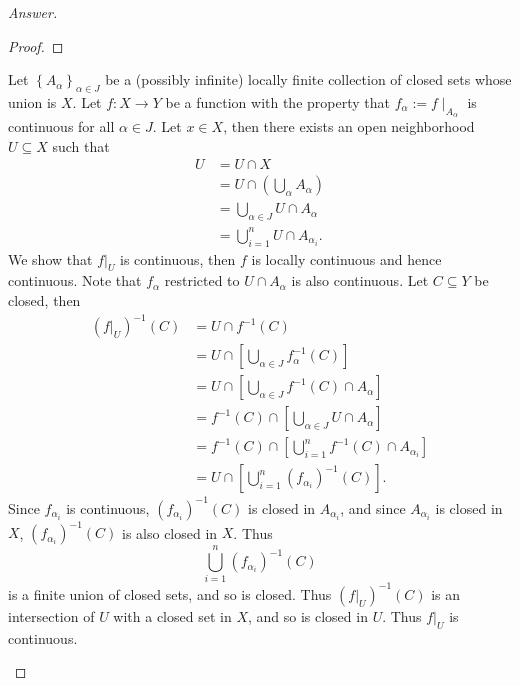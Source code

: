 \documentclass[12pt]{article}
\newcommand\inv[1]{#1^{-1}}
\newcommand\paren[1]{\left( #1 \right)}
\newcommand\setb[1]{\left \{ #1 \right \}}
\newcommand{\sqbrack}[1]{\left [ #1 \right ]}
\theoremstyle{definition}
\begin{document}
\begin{proof}[Answer]
\begin{enumerate}[(i)]
\begin{proof}
        \end{proof}
        Let $\setb{ A_{\alpha} }_{\alpha \in J}$ be a (possibly infinite) locally finite collection of closed sets whose union is $X$. Let $f : X \to Y$ be a function with the property that $f_{\alpha} := f \mid_{A_{\alpha}}$ is continuous for all $\alpha \in J$. Let $x \in X$, then there exists an open neighborhood $U \subseteq X$ such that 
        \begin{align*}
            U & = U \cap X \\
            & = U \cap \paren{ \bigcup\limits_{\alpha} A_{\alpha} } \\
            & = \bigcup\limits_{\alpha \in J} U \cap A_{\alpha} \\
            & = \bigcup\limits_{i = 1}^n U \cap A_{\alpha_i}.
        \end{align*}
        We show that $\left. f \right|_U$ is continuous, then $f$ is locally continuous and hence continuous. Note that $f_{\alpha}$ restricted to $U \cap A_{\alpha}$ is also continuous. Let $C \subseteq Y$ be closed, then 
        \begin{align*}
            \inv{ \paren{ \left. f \right|_U } }(C) & = U \cap \inv{f}(C) \\
            & = U \cap \sqbrack{ \bigcup\limits_{\alpha \in J} \inv{f_{\alpha}}(C) } \\
            & = U \cap \sqbrack{ \bigcup\limits_{\alpha \in J} \inv{f}(C) \cap A_{\alpha} } \\
            & = \inv{f}(C) \cap \sqbrack{ \bigcup\limits_{\alpha \in J} U \cap A_{\alpha} } \\
            & = \inv{f}(C) \cap \sqbrack{ \bigcup\limits_{i = 1}^n \inv{f}(C) \cap A_{\alpha_i} } \\
            & = U \cap \sqbrack{ \bigcup\limits_{i = 1}^n \inv{ \paren{ f_{\alpha_i} } } (C) }.
        \end{align*}
        Since $f_{\alpha_i}$ is continuous, $\inv{ \paren{ f_{\alpha_i} } } (C)$ is closed in $A_{\alpha_i}$, and since $A_{\alpha_i}$ is closed in $X$, $\inv{ \paren{ f_{\alpha_i} } } (C)$ is also closed in $X$. Thus 
        \[
            \bigcup\limits_{i = 1}^n \inv{ \paren{ f_{\alpha_i} } } (C)
        \]
        is a finite union of closed sets, and so is closed. Thus $\inv{ \paren{ \left. f \right|_U } }(C)$ is an intersection of $U$ with a closed set in $X$, and so is closed in $U$. Thus $\left. f \right|_U$ is continuous.
    \end{enumerate}
\end{proof}
\end{document}
